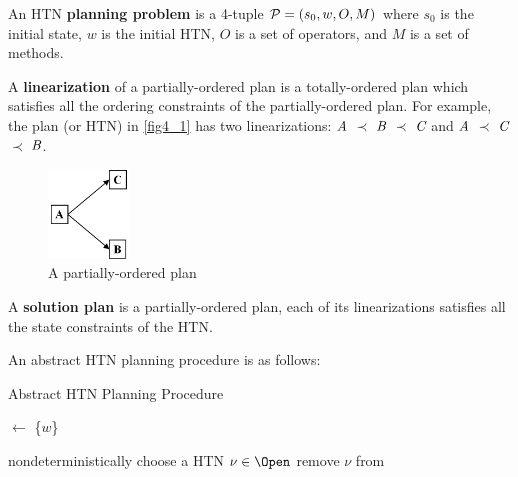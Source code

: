An HTN \textbf{planning problem} is a 4-tuple ${\cal{P}} = (s_0, w, O, M)$ where $s_0$ is the initial state, $w$ is the initial HTN, $O$ is a set of operators, and $M$ is a set of methods.

A \textbf{linearization} of a partially-ordered plan is a totally-ordered plan which satisfies all the ordering constraints of the partially-ordered plan. For example, the plan (or HTN) in \autoref{fig4_1} has two linearizations: $\emph{A}$ $\prec$ $\emph{B}$ $\prec$ $\emph{C}$ and $\emph{A}$ $\prec$ $\emph{C}$ $\prec$ $\emph{B}$.

\begin{figure}[H]
    \center
    \includegraphics[width=0.19\textwidth]{./images/4_1.png}
    \caption{A partially-ordered plan}
    \label{fig4_1}
\end{figure}

A \textbf{solution plan} is a partially-ordered plan, each of its linearizations satisfies all the state constraints of the HTN.

An abstract HTN planning procedure is as follows:

\begin{algorithm}[H] 
\caption{Abstract HTN Planning Procedure}
\label{Algo:HTN}


\Open $\leftarrow$ \{$w$\} \;

\While{\Open $\ne \emptyset$} {
  nondeterministically choose a HTN $\nu \in \Open$ \;
  remove $\nu$ from \Open\;
}
\Return \Failure \;
\end{algorithm}

